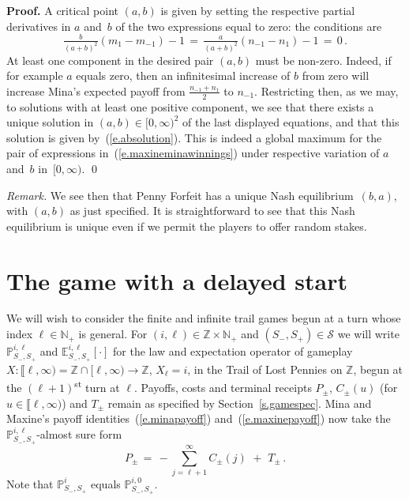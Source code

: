 \documentclass[letterpaper,11pt,oneside,reqno]{amsbook}
\newcommand{\PP}{\ensuremath{\mathbb{P}}}
\newcommand{\N}{\ensuremath{\mathbb{N}}}
\newcommand{\Z}{\ensuremath{\mathbb{Z}}}
\newcommand{\E}[0]{\mathbb{E}}
\numberwithin{figure}{chapter}
\theoremstyle{definition}
\theoremstyle{definition}
\theoremstyle{definition}
\theoremstyle{definition}
\theoremstyle{definition}
\newcommand{\mc}{\mathcal}
\newcommand{\nwithoutzero}{\N_+}
\def\hfff#1{\label{#1}}
\begin{document}
{\bf Proof.} A critical point $(a,b)$ is given by setting the respective partial derivatives in $a$ and~$b$ of the two expressions equal to zero: the conditions are 
$$
\tfrac{b}{(a+b)^2}(m_1 - m_{-1}) - 1 \, = \, \tfrac{a}{(a+b)^2}(n_{-1} - n_1) - 1 \, = \, 0 \, . 
$$
At least one component in the desired pair $(a,b)$ must be non-zero. 
Indeed, if for example $a$ equals zero,
then an infinitesimal increase of $b$ from zero will increase Mina's expected payoff from $\tfrac{n_{-1}+n_1}{2}$ to $n_{-1}$. 
Restricting then, as we may, to solutions with at least one positive component, 
we see that there exists a unique solution in $(a,b) \in [0,\infty)^2$ of the last displayed equations, and that this solution is given by~(\ref{e.absolution}). This is indeed a global maximum for the pair of expressions in~(\ref{e.maxineminawinnings}) under respective variation of $a$ and~$b$ in~$[0,\infty)$. \qed

{\em Remark.} We see then that Penny Forfeit has a unique Nash equilibrium~$(b,a)$, with $(a,b)$ as just specified. It is straightforward to see that this Nash equilibrium is unique even if we permit the players to offer random stakes. 
  
  \section{The game with a delayed start}\label{s.delayedstart}

  
We will wish to consider the finite and infinite trail games begun at a turn whose index $\ell \in \nwithoutzero$ is general. For $(i,\ell) \in \Z \times \nwithoutzero$ and $(S_-,S_+) \in \mc{S}$ 
we will write\hfff{delayed} $\PP_{S_-,S_+}^{i,\ell}$ and $\E_{S_-,S_+}^{i,\ell}[\cdot]$  for the law and expectation operator of
gameplay $X: \llbracket \ell,\infty) = \Z \cap [\ell,\infty) \to \Z$, $X_\ell = i$, in the Trail of Lost Pennies on $\Z$, begun at the $(\ell + 1)$\textsuperscript{st} turn at $\ell$. Payoffs, costs and terminal receipts 
$P_\pm$, $C_\pm(u)$ (for $u \in \llbracket \ell,\infty)$) and $T_{\pm}$ remain as specified by Section~\ref{s.gamespec}. Mina and Maxine's payoff identities~(\ref{e.minapayoff}) and~(\ref{e.maxinepayoff}) now take the $\PP_{S_-,S_+}^{i,\ell}$-almost sure form
 \begin{equation}\label{e.delayedpayoff}
 P_\pm \, = \,  - \sum_{j = \ell +1}^\infty C_\pm(j)  \,\, + \,\,  T_\pm \, .
 \end{equation}
Note that  $\PP_{S_-,S_+}^i$ equals $\PP_{S_-,S_+}^{i,0}$.
\end{document}
